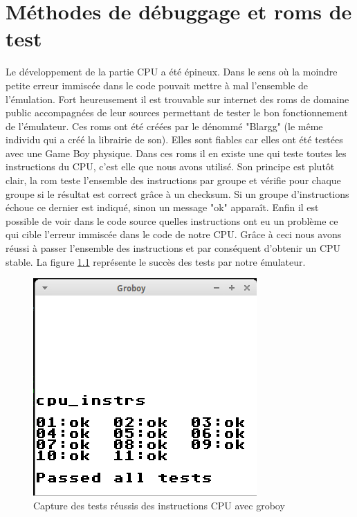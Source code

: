 \documentclass{report}
\begin{document}
\chapter{Méthodes de débuggage et roms de test}
Le développement de la partie CPU a été épineux. Dans le sens où la moindre petite erreur immiscée dans le code pouvait mettre à mal l'ensemble de l'émulation. Fort heureusement il est trouvable sur internet des roms de domaine public accompagnées de leur sources permettant de tester le bon fonctionnement de l'émulateur. Ces roms ont été créées par le dénommé "Blargg" (le même individu qui a créé la librairie de son). Elles sont fiables car elles ont été testées avec une Game Boy physique. Dans ces roms il en existe une qui teste toutes les instructions du CPU, c'est elle que nous avons utilisé. Son principe est plutôt clair, la rom teste l'ensemble des instructions par groupe et vérifie pour chaque groupe si le résultat est correct grâce à un checksum. Si un groupe d'instructions échoue ce dernier est indiqué, sinon un message "ok" apparaît. Enfin il est possible de voir dans le code source quelles instructions ont eu un problème ce qui cible l'erreur immiscée dans le code de notre CPU. Grâce à ceci nous avons réussi à passer l'ensemble des instructions et par conséquent d'obtenir un CPU stable. La figure \ref{testcpu} représente le succès des tests par notre émulateur.
\begin{figure}[!h]
\centering
\includegraphics[scale=0.4]{images/screenshot_cpu_blargg.png}
\caption{Capture des tests réussis des instructions CPU avec groboy}
\label{testcpu}
\end{figure}
\printglossaries
\end{document}
